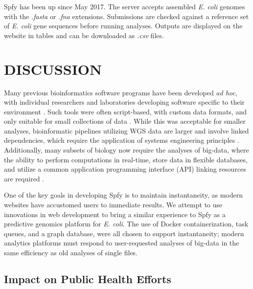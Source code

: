 \documentclass{article}
\begin{document}
\small 

Spfy has been up since May 2017. The server accepts assembled \textit{E. coli} genomes with the \textit{.fasta} or \textit{.fna} extensions. Submissions are checked against a reference set of \textit{E. coli} gene sequences before running analyses. Outputs are displayed on the website in tables and can be downloaded as \textit{.csv} files. 
\par



\section{DISCUSSION}

Many previous bioinformatics software programs have been developed \textit{ad hoc}, with individual researchers and laboratories developing software specific to their environment \cite{de2015trends}.
Such tools were often script-based, with custom data formats, and only suitable for small collections of data \cite{de2015trends}.
While this was acceptable for smaller analyses, bioinformatic pipelines utilizing WGS data are larger and involve linked dependencies, which require the application of systems engineering principles \cite{schatz2015biological}.
Additionally, many subsets of biology now require the analyses of big-data, where the ability to perform computations in real-time, store data in flexible databases, and utilize a common application programming interface (API) linking resources are required \cite{swaminathan2016review}.

One of the key goals in developing Spfy is to maintain instantaneity, as modern websites have accustomed users to immediate results.
We attempt to use innovations in web development to bring a similar experience to Spfy as a predictive genomics platform for \textit{E. coli}.
The use of Docker containerization, task queues, and a graph database, were all chosen to support instantaneity; modern analytics platforms must respond to user-requested analyses of big-data in the same efficiency as old analyses of single files.

\subsection{Impact on Public Health Efforts}
\end{document}
